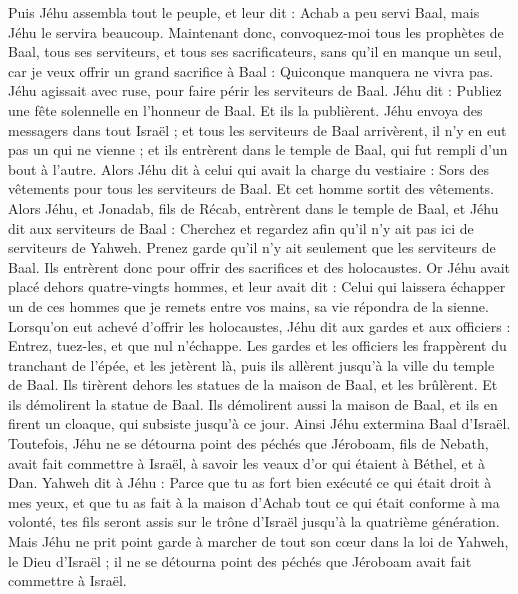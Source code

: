 \begin{multicols}{2}
Puis Jéhu assembla tout le peuple, et leur dit : Achab a peu servi Baal, mais Jéhu le servira beaucoup.
Maintenant donc, convoquez-moi tous les prophètes de Baal, tous ses serviteurs, et tous ses sacrificateurs, sans qu’il en manque un seul, car je veux offrir un grand sacrifice à Baal : Quiconque manquera ne vivra pas. Jéhu agissait avec ruse, pour faire périr les serviteurs de Baal.
Jéhu dit : Publiez une fête solennelle en l’honneur de Baal. Et ils la publièrent.
Jéhu envoya des messagers dans tout Israël ; et tous les serviteurs de Baal arrivèrent, il n’y en eut pas un qui ne vienne ; et ils entrèrent dans le temple de Baal, qui fut rempli d’un bout à l’autre.
Alors Jéhu dit à celui qui avait la charge du vestiaire : Sors des vêtements pour tous les serviteurs de Baal. Et cet homme sortit des vêtements.
Alors Jéhu, et Jonadab, fils de Récab, entrèrent dans le temple de Baal, et Jéhu dit aux serviteurs de Baal : Cherchez et regardez afin qu’il n’y ait pas ici de serviteurs de Yahweh. Prenez garde qu’il n’y ait seulement que les serviteurs de Baal.
Ils entrèrent donc pour offrir des sacrifices et des holocaustes. Or Jéhu avait placé dehors quatre-vingts hommes, et leur avait dit : Celui qui laissera échapper un de ces hommes que je remets entre vos mains, sa vie répondra de la sienne.
Lorsqu’on eut achevé d’offrir les holocaustes, Jéhu dit aux gardes et aux officiers : Entrez, tuez-les, et que nul n’échappe. Les gardes et les officiers les frappèrent du tranchant de l’épée, et les jetèrent là, puis ils allèrent jusqu’à la ville du temple de Baal.
Ils tirèrent dehors les statues de la maison de Baal, et les brûlèrent.
Et ils démolirent la statue de Baal. Ils démolirent aussi la maison de Baal, et ils en firent un cloaque, qui subsiste jusqu’à ce jour.
Ainsi Jéhu extermina Baal d’Israël.
Toutefois, Jéhu ne se détourna point des péchés que Jéroboam, fils de Nebath, avait fait commettre à Israël, à savoir les veaux d’or qui étaient à Béthel, et à Dan.
Yahweh dit à Jéhu : Parce que tu as fort bien exécuté ce qui était droit à mes yeux, et que tu as fait à la maison d’Achab tout ce qui était conforme à ma volonté, tes fils seront assis sur le trône d’Israël jusqu’à la quatrième génération.
Mais Jéhu ne prit point garde à marcher de tout son cœur dans la loi de Yahweh, le Dieu d’Israël ; il ne se détourna point des péchés que Jéroboam avait fait commettre à Israël.

\end{multicols}
